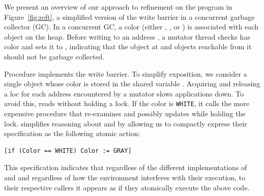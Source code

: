 We present an overview of our approach to refinement on the program in Figure~\ref{fig:reft},
a simplified version of the write barrier in a concurrent garbage collector (GC).
In a concurrent GC, a color (either , , or )
is associated with each object on the heap.  
Before writing to an address , a mutator thread checks 
 has color 
and sets it to , indicating that the object at 
and objects reachable from it should not be garbage collected. 

Procedure  implements the write barrier.
To simplify exposition, 
we consider a single object whose color is stored in the shared variable .
Acquiring and releasing a loc for each address encountered by a
mutator slows applications down. To avoid this, 
 reads  without holding a lock.
If the color is {\tt WHITE}, it calls the more expensive procedure  
that re-examines and possibly updates  while holding the lock.
\civl simplifies reasoning about  and  by allowing us to 
compactly express their specification as the following atomic action:
\begin{verbatim}
[if (Color == WHITE) Color := GRAY]
\end{verbatim}
This specification indicates that regardless of the different implementations of 
 and  and regardless of how the environment interferes
with their execution, to their respective callers it appears as if they atomically execute the above code.


